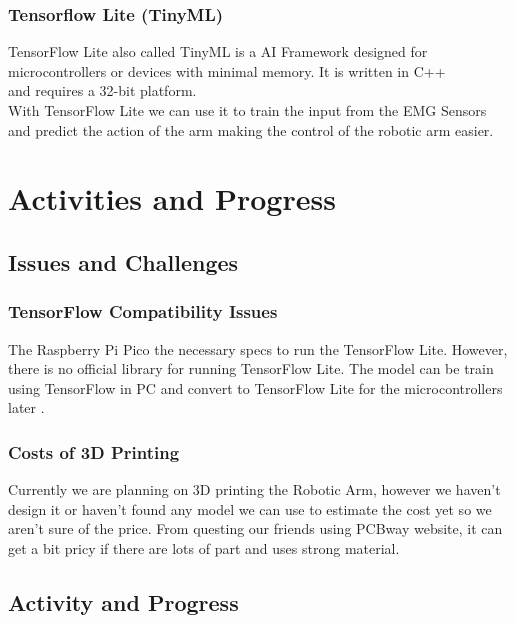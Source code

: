 \documentclass[12pt]{article}
\begin{document}
    \subsubsection{Tensorflow Lite (TinyML)}
    \begin{flushleft}
        TensorFlow Lite also called TinyML is a AI Framework designed for \\
        microcontrollers or devices with minimal memory. It is written in C++ \\
        and requires a 32-bit platform.\\
        \hspace*{2em}With TensorFlow Lite we can use it to train the input from the EMG Sensors\\
        and predict the action of the arm making the control of the robotic arm easier.
    \end{flushleft}
    \section{Activities and Progress}
    \subsection{Issues and Challenges}
    \subsubsection{TensorFlow Compatibility Issues}
    \begin{flushleft}
    The Raspberry Pi Pico the necessary specs to run the TensorFlow Lite. However, there is no official library for running TensorFlow Lite. The model can be train using TensorFlow in PC 
    and convert to TensorFlow Lite for the microcontrollers later \cite{tensorflow}.
    \end{flushleft}
    \subsubsection{Costs of 3D Printing}
    \begin{flushleft}
        Currently we are planning on 3D printing the Robotic Arm, however we haven't design it or haven't found any model we can use to estimate the cost yet so we aren't sure of
        the price. From questing our friends using PCBway website, it can get a bit pricy if there are lots of part and uses strong material.
    \end{flushleft}
    \subsection{Activity and Progress}
\end{document}
